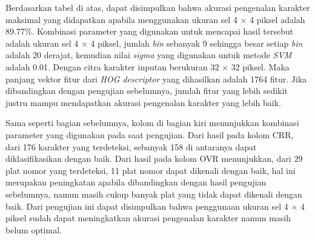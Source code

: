 Berdasarkan tabel di atas, dapat disimpulkan bahwa akurasi pengenalan karakter maksimal yang didapatkan apabila menggunakan ukuran sel 4 $\times$ 4 piksel adalah 89.77\%. Kombinasi parameter yang digunakan untuk mencapai hasil tersebut adalah ukuran sel 4 $\times$ 4 piksel, jumlah \textit{bin} sebanyak 9 sehingga besar setiap \textit{bin} adalah 20 derajat, kemudian nilai \textit{sigma} yang digunakan untuk metode \textit{SVM} adalah 0.01. Dengan citra karakter inputan berukuran 32 $\times$ 32 piksel. Maka panjang vektor fitur dari \textit{HOG descriptor} yang dihasilkan adalah 1764 fitur. Jika dibandingkan dengan pengujian sebelumnya, jumlah fitur yang lebih sedikit justru mampu mendapatkan akurasi pengenalan karakter yang lebih baik.

Sama seperti bagian sebelumnya, kolom di bagian kiri menunjukkan kombinasi parameter yang digunakan pada saat pengujian. Dari hasil pada kolom CRR, dari 176 karakter yang terdeteksi, sebanyak 158 di antaranya dapat diklasifikasikan dengan baik. Dari hasil pada kolom OVR menunjukkan, dari 29 plat nomor yang terdeteksi, 11 plat nomor dapat dikenali dengan baik, hal ini merupakan peningkatan apabila dibandingkan dengan hasil pengujian sebelumnya, namun masih cukup banyak plat yang tidak dapat dikenali dengan baik. Dari pengujian ini dapat  disimpulkan bahwa penggunaan ukuran sel 4 $\times$ 4 piksel sudah dapat meningkatkan akurasi pengenalan karakter namun masih belum optimal.\\

